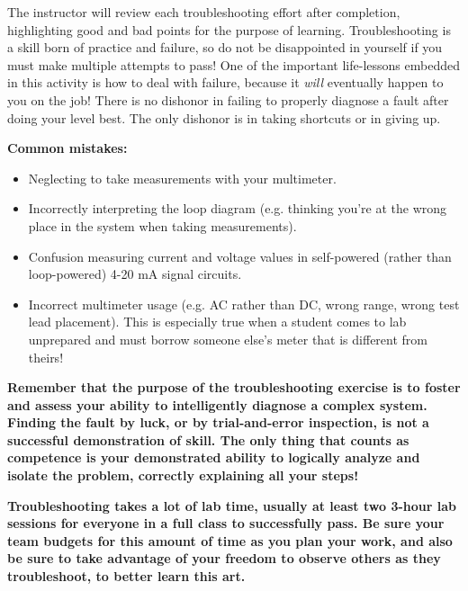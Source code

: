 The instructor will review each troubleshooting effort after completion, highlighting good and bad points for the purpose of learning.  Troubleshooting is a skill born of practice and failure, so do not be disappointed in yourself if you must make multiple attempts to pass!  One of the important life-lessons embedded in this activity is how to deal with failure, because it {\it will} eventually happen to you on the job!  There is no dishonor in failing to properly diagnose a fault after doing your level best.  The only dishonor is in taking shortcuts or in giving up.

\vskip 10pt

{\bf Common mistakes:}

\begin{itemize}
\item{} Neglecting to take measurements with your multimeter.
\item{} Incorrectly interpreting the loop diagram (e.g. thinking you're at the wrong place in the system when taking measurements).
\item{} Confusion measuring current and voltage values in self-powered (rather than loop-powered) 4-20 mA signal circuits.
\item{} Incorrect multimeter usage (e.g. AC rather than DC, wrong range, wrong test lead placement).  This is especially true when a student comes to lab unprepared and must borrow someone else's meter that is different from theirs!
\end{itemize}

\vskip 10pt

{\bf Remember that the purpose of the troubleshooting exercise is to foster and assess your ability to intelligently diagnose a complex system.  Finding the fault by luck, or by trial-and-error inspection, is not a successful demonstration of skill.  The only thing that counts as competence is your demonstrated ability to logically analyze and isolate the problem, correctly explaining all your steps!}

\vskip 10pt

{\bf Troubleshooting takes a lot of lab time, usually at least two 3-hour lab sessions for everyone in a full class to successfully pass.  Be sure your team budgets for this amount of time as you plan your work, and also be sure to take advantage of your freedom to observe others as they troubleshoot, to better learn this art.}



\vfil \eject

